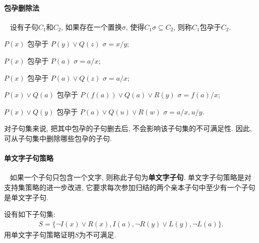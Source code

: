 \paragraph{包孕删除法}~{}
设有子句$C_1$和$C_2$, 如果存在一个置换$\sigma $, 使得$C_1\sigma \subseteq C_2$, 则称$C_1$包孕于$C_2$.
\begin{example}
    $P(x)$             包孕于   $P(y)\vee Q(z)$             $\sigma ={x/y}$;

    $P(x)$             包孕于   $P(a)$                      $\sigma ={a/x}$;

    $P(x)$             包孕于   $P(a)\vee Q(z)$             $\sigma ={a/x}$;

    $P(x) \vee Q(a)$ 包孕于 $P(f(a))\vee Q(a)\vee R(y)$    $\sigma ={f(a)/x}$;

    $P(x) \vee Q(y)$ 包孕于 $P(a)\vee Q(u)\vee R(w)$        $\sigma ={a/x, u/y}$.
\end{example}

对子句集来说, 把其中包孕的子句删去后, 不会影响该子句集的不可满足性. 因此, 可从子句集中删除哪些包孕的子句.
\paragraph{单文字子句策略}~{}
如果一个子句只包含一个文字, 则称此子句为\textbf{单文字子句}. 单文字子句策略是对支持集策略的进一步改进, 它要求每次参加归结的两个亲本子句中至少有一个子句是单文字子句.
\begin{example}
设有如下子句集:
\begin{align}
  S=\{\neg I(x)\vee R(x),  I(a), \neg R(y)\vee L(y), \neg L(a)\}.
\end{align}
用单文字子句策略证明$S$为不可满足.
\end{example}


